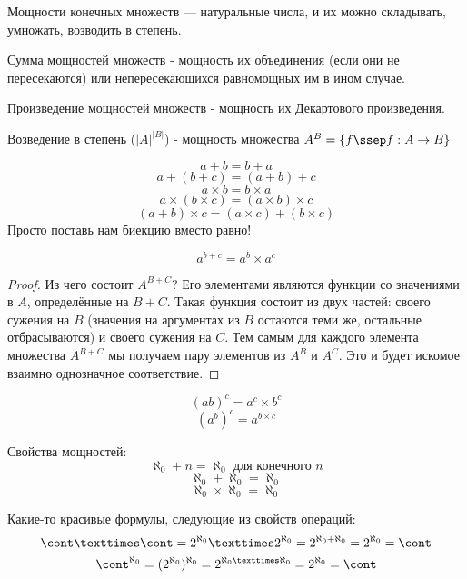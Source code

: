 Мощности конечных множеств — натуральные числа, и их можно складывать, умножать, возводить в степень.

\begin{definition} \thmslashn

	Сумма мощностей множеств - мощность их объединения (если они не пересекаются) или непересекающихся равномощных им в ином случае.
\end{definition}

\begin{definition} \thmslashn

	Произведение мощностей множеств - мощность их Декартового произведения.
\end{definition}

\begin{definition} \thmslashn

	Возведение в степень ($|A|^{|B|}$) - мощность множества $A^B = \{f \ssep f: A\rightarrow B\}$
\end{definition}

\[a + b = b + a\]
\[a + (b + c) = (a + b) + c\]
\[a × b = b × a\]
\[a × (b × c) = (a × b) × c\]
\[(a + b) × c = (a × c) + (b × c)\]
Просто поставь нам биекцию вместо равно!

\begin{theorem} \thmslashn

	\[a^{b+c} = a^b × a^c\]
	
	\begin{proof} \thmslashn
	
		Из чего состоит $A^{B+C}$? Его элементами являются функции со значениями в $A$, определённые на $B + C$. Такая функция состоит из двух частей: своего сужения на $B$ (значения на аргументах из $B$ остаются теми же, остальные отбрасываются) и своего сужения на $C$. Тем самым для каждого элемента множества $A^{B+C}$ мы получаем пару элементов из $A^B$ и $A^C$. Это и будет искомое взаимно однозначное соответствие.
	\end{proof}
\end{theorem}

\[(ab)^c = a^c × b^c\]
\[(a^b)^c = a^{b × c}\]


Свойства мощностей:
\[\aleph_0 + n = \aleph_0 \text{ для конечного } n \]
\[\aleph_0 + \aleph_0 = \aleph_0\]
\[\aleph_0 × \aleph_0 = \aleph_0\]

Какие-то красивые формулы, следующие из свойств операций:
\[\cont × \cont = 2^{\aleph_0} × 2^{\aleph_0} = 2^{\aleph_0 + \aleph_0} = 2^{\aleph_0} = \cont\]
\[\cont^{\aleph_0} = (2^{\aleph_0})^{\aleph_0} = 2^{\aleph_0×\aleph_0} = 2^{\aleph_0} = \cont\]


















